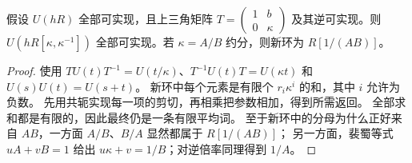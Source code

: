 \begin{lemma}[可逆倍率扩展剪切参数]\label{lem:localize}
假设 $U(hR)$ 全部可实现，且上三角矩阵 $T=\left(\begin{smallmatrix}1&b\\0&\kappa\end{smallmatrix}\right)$ 及其逆可实现。则 $U(hR[\kappa,\kappa^{-1}])$ 全部可实现。若 $\kappa=A/B$ 约分，则新环为 $R[1/(AB)]$。
\end{lemma}
\begin{proof}
使用 $TU(t)T^{-1}=U(t/\kappa)$、$T^{-1}U(t)T=U(\kappa t)$ 和 $U(s)U(t)=U(s+t)$。
新环中每个元素是有限个 $r_i\kappa^i$ 的和，其中 $i$ 允许为负数。
先用共轭实现每一项的剪切，再相乘把参数相加，得到所需返回。
全部求和都是有限的，因此最终仍是一条有限平均词。
至于新环中的分母为什么正好来自 $AB$，一方面 $A/B$、$B/A$ 显然都属于 $R[1/(AB)]$；
另一方面，裴蜀等式 $uA+vB=1$ 给出 $u\kappa+v=1/B$；对逆倍率同理得到 $1/A$。
\end{proof}


